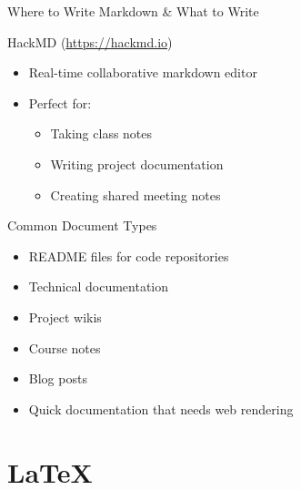 \documentclass[10pt]{beamer}
\begin{document}
\begin{frame}[fragile]{Where to Write Markdown \& What to Write}
  \begin{block}{HackMD (\url{https://hackmd.io})}
    \begin{itemize}
      \item Real-time collaborative markdown editor
      \item Perfect for:
        \begin{itemize}
          \item Taking class notes
          \item Writing project documentation
          \item Creating shared meeting notes
        \end{itemize}
    \end{itemize}
  \end{block}

  \begin{block}{Common Document Types}
    \begin{itemize}
      \item README files for code repositories
      \item Technical documentation
      \item Project wikis
      \item Course notes
      \item Blog posts
      \item Quick documentation that needs web rendering
    \end{itemize}
  \end{block}
\end{frame}



\section{LaTeX}
\end{document}
